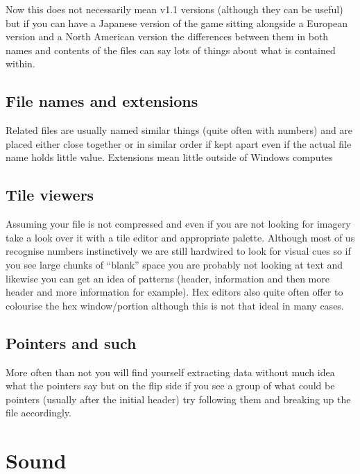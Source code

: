 \documentclass[
]{book}
\begin{document}
Now this does not necessarily mean v1.1 versions (although they can be useful) but if you can have a Japanese version of the game sitting alongside a European version and a North American version the differences between them in both names and contents of the files can say lots of things about what is contained within.

\hypertarget{file-names-and-extensions}{%
\section{File names and extensions}\label{file-names-and-extensions}}

Related files are usually named similar things (quite often with numbers) and are placed either close together or in similar order if kept apart even if the actual file name holds little value. Extensions mean little outside of Windows computes

\hypertarget{tile-viewers}{%
\section{Tile viewers}\label{tile-viewers}}

Assuming your file is not compressed and even if you are not looking for imagery take a look over it with a tile editor and appropriate palette. Although most of us recognise numbers instinctively we are still hardwired to look for visual cues so if you see large chunks of ``blank'' space you are probably not looking at text and likewise you can get an idea of patterns (header, information and then more header and more information for example). Hex editors also quite often offer to colourise the hex window/portion although this is not that ideal in many cases.

\hypertarget{pointers-and-such}{%
\section{Pointers and such}\label{pointers-and-such}}

More often than not you will find yourself extracting data without much idea what the pointers say but on the flip side if you see a group of what could be pointers (usually after the initial header) try following them and breaking up the file accordingly.

\hypertarget{sound-1}{%
\chapter{Sound}\label{sound-1}}
\end{document}
